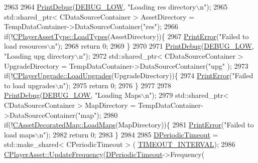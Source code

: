 \begin{DoxyCode}
2963     
2964     \hyperlink{Debug_8h_aa5f00f5537c9760f6ae1782460748ab9}{PrintDebug}(\hyperlink{Debug_8h_a3a5f3fc09784650d8388cb854882f840}{DEBUG\_LOW}, \textcolor{stringliteral}{"Loading res directory\(\backslash\)n"});
2965     std::shared\_ptr< CDataSourceContainer > AssetDirectory = TempDataContainer->DataSourceContainer(\textcolor{stringliteral}{"res"});
2966     \textcolor{keywordflow}{if}(!\hyperlink{classCPlayerAssetType_ad36348338ae4fea7e70450ef30c92a26}{CPlayerAssetType::LoadTypes}(AssetDirectory))\{
2967         \hyperlink{Debug_8h_a2ed825eefefe35baf59a93a8c641323d}{PrintError}(\textcolor{stringliteral}{"Failed to load resources\(\backslash\)n"});
2968         \textcolor{keywordflow}{return} 0;   
2969     \}
2970     
2971     \hyperlink{Debug_8h_aa5f00f5537c9760f6ae1782460748ab9}{PrintDebug}(\hyperlink{Debug_8h_a3a5f3fc09784650d8388cb854882f840}{DEBUG\_LOW}, \textcolor{stringliteral}{"Loading upg directory\(\backslash\)n"});
2972     std::shared\_ptr< CDataSourceContainer > UpgradeDirectory = TempDataContainer->DataSourceContainer(\textcolor{stringliteral}{"upg"}
      );
2973     \textcolor{keywordflow}{if}(!\hyperlink{classCPlayerUpgrade_a9bef3d3f2866cd555a9b175426e953d6}{CPlayerUpgrade::LoadUpgrades}(UpgradeDirectory))\{
2974         \hyperlink{Debug_8h_a2ed825eefefe35baf59a93a8c641323d}{PrintError}(\textcolor{stringliteral}{"Failed to load upgrades\(\backslash\)n"});
2975         \textcolor{keywordflow}{return} 0;   
2976     \}
2977 
2978     \hyperlink{Debug_8h_aa5f00f5537c9760f6ae1782460748ab9}{PrintDebug}(\hyperlink{Debug_8h_a3a5f3fc09784650d8388cb854882f840}{DEBUG\_LOW}, \textcolor{stringliteral}{"Loading Maps\(\backslash\)n"});
2979     std::shared\_ptr< CDataSourceContainer > MapDirectory = TempDataContainer->DataSourceContainer(\textcolor{stringliteral}{"map"});
2980     \textcolor{keywordflow}{if}(!\hyperlink{classCAssetDecoratedMap_a03b043bddf72e2d97171b704f538f4d0}{CAssetDecoratedMap::LoadMaps}(MapDirectory))\{
2981         \hyperlink{Debug_8h_a2ed825eefefe35baf59a93a8c641323d}{PrintError}(\textcolor{stringliteral}{"Failed to load maps\(\backslash\)n"});
2982         \textcolor{keywordflow}{return} 0;   
2983     \}
2984     
2985     \hyperlink{classCApplicationData_a0265cb7aba9f099faed2a1c8ee588d33}{DPeriodicTimeout} = std::make\_shared< CPeriodicTimeout > (
      \hyperlink{main_8cpp_a13f06f86104b4525a9429ff04d1c852d}{TIMEOUT\_INTERVAL});
2986     \hyperlink{classCPlayerAsset_a0aff85b9552967a42f4f3f42cb59c19f}{CPlayerAsset::UpdateFrequency}(\hyperlink{classCApplicationData_a0265cb7aba9f099faed2a1c8ee588d33}{DPeriodicTimeout}->Frequency(

\end{DoxyCode}
